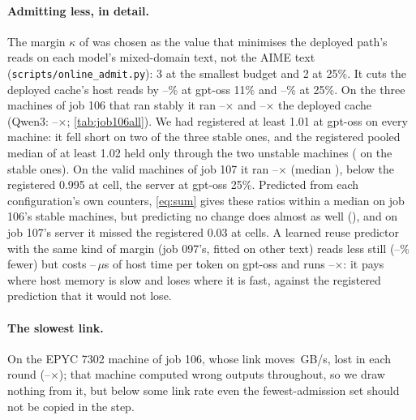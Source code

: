 \paragraph{Admitting less, in detail.} The margin $\kappa$ of \Margin{} was chosen as the value that minimises the deployed path's
reads on each model's mixed-domain text, not the AIME text (\texttt{scripts/online\_admit.py}): 3 at the smallest budget
and 2 at 25\%. It cuts the deployed cache's host reads by \jiDkReadsGLowMin--\jiDkReadsGLowMax\% at gpt-oss 11\% and
\jiDkReadsGMidMin--\jiDkReadsGMidMax\% at 25\%. On the three machines of job 106 that ran stably it ran
\jiDkGLowMin--\jiDkGLowMax$\times$ and \jiDkGMidMin--\jiDkGMidMax$\times$ the deployed cache (Qwen3:
\jiDkQLowMin--\jiDkQMidMax$\times$; \cref{tab:job106all}). We had registered at least 1.01 at gpt-oss on every machine: it
fell short on two of the three stable ones, and the registered pooled median of at least 1.02 held only through the
two unstable machines (\jiDkPooled{} on the stable ones). On the \jlValidWord{} valid machines of job 107 it ran
\jlDkMin--\jlDkMax$\times$ (median \jlDkMed), below the registered 0.995 at \jlDkFailWord{} cell, the server at gpt-oss
25\%. Predicted from each configuration's own counters, \cref{eq:sum} gives these ratios within a median
\jiRatioPredMed{} on job 106's stable machines, but predicting no change does almost as well (\jiNoChangeMed), and on
job 107's server it missed the registered 0.03 at \jlDkPredFailN{} cells. A learned reuse predictor with the same kind
of margin (job 097's, fitted on other text) reads less still (\jiLrnReadsGLowMin--\jiLrnReadsGMidMax\% fewer) but costs
\jiLrnUsGMin--\jiLrnUsGMax\,$\mu$s of host time per token on gpt-oss and runs \jiLrnGLowMin--\jiLrnGMidMax$\times$: it pays
where host memory is slow and loses where it is fast, against the registered prediction that it would not lose.

\paragraph{The slowest link.} On the EPYC 7302 machine of job 106, whose link moves \jiVsLink\,GB/s,
\FewOne{} lost in each round (\jiVsPlanMin--\jiVsPlanMax$\times$); that machine computed wrong outputs
throughout, so we draw nothing from it, but below some link rate even the fewest-admission set should not be copied in
the step.


